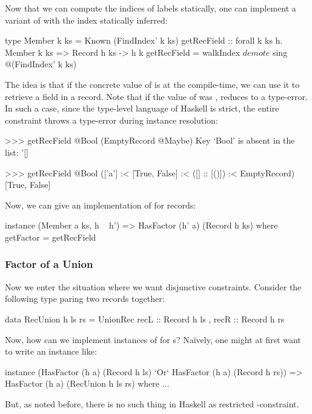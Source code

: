 \documentclass[demotion-paper.tex]{subfiles}
\begin{document}
Now that we can compute the indices of labels statically, one can implement a variant of  with the index statically inferred:
\begin{code}
type Member k ks = Known (FindIndex' k ks)
getRecField :: forall k ks h.
  Member k ks => Record h ks -> h k
getRecField = walkIndex $ 
  demote $ sing @(FindIndex' k ks)
\end{code}
The idea is that if the concrete value of  is  at the compile-time, we can use it to retrieve a field in a record.
Note that if the value of  was ,  reduces to a type-error.
In such a case, since the type-level language of Haskell is strict, the entire constraint  throws a type-error during instance resolution:
\begin{repl}
>>> getRecField @Bool (EmptyRecord @Maybe)
Key `Bool' is absent in the list: '[]

>>> getRecField @Bool (['a'] :< [True, False]
                :< ([] :: [()]) :< EmptyRecord)
[True, False]
\end{repl}

Now, we can give an implementation of  for records:
\begin{code}
instance (Member a ks, h ~ h')
      => HasFactor (h' a) (Record h ks) where
  getFactor = getRecField
\end{code}

\subsubsection{Factor of a Union}
Now we enter the situation where we want disjunctive constraints.
Consider the following type paring two records together:
\begin{code}
data RecUnion h ls rs = 
  UnionRec { recL :: Record h ls
           , recR :: Record h rs }
\end{code}
Now, how can we implement instances of  for s?
Na\"{i}vely, one might at first want to write an instance like:
\begin{code}
instance (HasFactor (h a) (Record h ls)
          `Or` HasFactor (h a) (Record h rs))
  => HasFactor (h a) (RecUnion h ls rs) where ...
\end{code}
But, as noted before, there is no such thing in Haskell as restricted -constraint.
\end{document}
